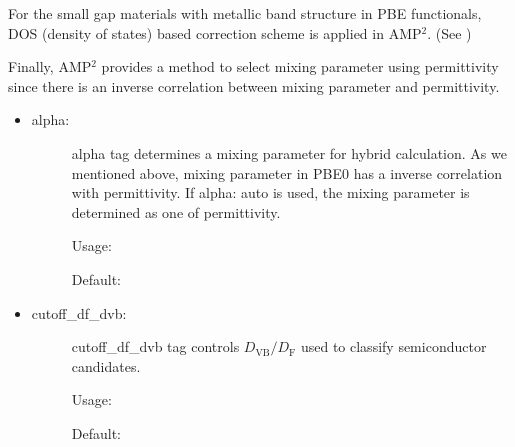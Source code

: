 \documentclass[letterpaper,10pt,english]{sphinxmanual}
\begin{document}
For the small gap materials with metallic band structure in PBE functionals, DOS (density of states) based correction scheme
is applied in AMP$^{\text{2}}$. (See )

Finally, AMP$^{\text{2}}$ provides a method to select mixing parameter using permittivity since there is an inverse correlation between
mixing parameter and permittivity.
\begin{itemize}
\item {} \begin{description}
\item[{alpha:}] \leavevmode
alpha tag determines a mixing parameter for hybrid calculation. As we mentioned above,
mixing parameter in PBE0 has a inverse correlation with permittivity. If alpha: auto is used,
the mixing parameter is determined as one of permittivity.

Usage:

\begin{sphinxVerbatim}[commandchars=\\\{\}]
   \PYG{p}{[}\PYG{p}{]}  
\end{sphinxVerbatim}

Default:

\begin{sphinxVerbatim}[commandchars=\\\{\}]
   
\end{sphinxVerbatim}

\end{description}

\item {} \begin{description}
\item[{cutoff\_df\_dvb:}] \leavevmode
cutoff\_df\_dvb tag controls \(D_{\textrm{VB}}/D_{\textrm{F}}\) used to classify semiconductor candidates.

Usage:

\begin{sphinxVerbatim}[commandchars=\\\{\}]
   \PYG{p}{[}\PYG{p}{]}
\end{sphinxVerbatim}

Default:


\end{description}
\end{itemize}
\end{document}
